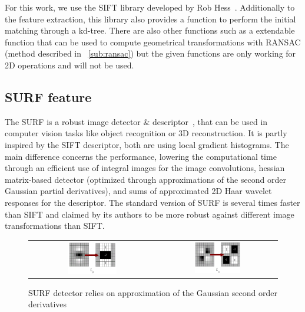 For this work, we use the \gls{SIFT} library developed by Rob Hess~\cite{hess_sift}. Additionally to the feature extraction, this library also provides a function to perform the initial matching through a kd-tree. There are also other functions such as a extendable function that can be used to compute geometrical transformations with \gls{RANSAC} (method described in ~\ref{sub:ransac}) but the given functions are only working for 2D operations and will not be used.

\subsection{SURF feature}

The \gls{SURF} is a robust image detector \& descriptor~\cite{surf}, that can be used in computer vision tasks like object recognition or 3D reconstruction. It is partly inspired by the \gls{SIFT} descriptor, both are using local gradient histograms. The main difference concerns the performance, lowering the computational time through an efficient use of integral images for the image convolutions, hessian matrix-based detector (optimized through approximations of the second order Gaussian partial derivatives), and sums of approximated 2D Haar wavelet responses for the descriptor. The standard version of \gls{SURF} is several times faster than \gls{SIFT} and claimed by its authors to be more robust against different image transformations than \gls{SIFT}.

\begin{figure}[H]
\centering
 \begin{tabular}{cc}
 \includegraphics[width=0.4\textwidth]{figures/surf_lyy} &
 \includegraphics[width=0.4\textwidth]{figures/surf_lxy}
 \end{tabular}
\caption{SURF detector relies on approximation of the Gaussian second order derivatives}
\end{figure}

